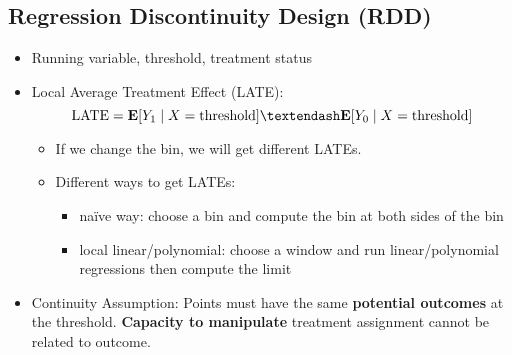 \documentclass[10pt, letterpaper]{article}
\def\E{\vb{E}}
\def\LATE{\mathrm{LATE}}
\begin{document}
\begin{multicols}{2}
\section*{Regression Discontinuity Design (RDD)}
\begin{itemize}
	\item Running variable, threshold, treatment status
	\item Local Average Treatment Effect (LATE): \[\LATE=\E[Y_1\mid X=\text{threshold}] – \E[Y_0\mid X=\text{threshold}]\]
	\begin{itemize}
		\item If we change the bin, we will get different LATEs.
		\item Different ways to get LATEs: 
		\begin{itemize}
			\item naïve way: choose a bin and compute the bin at both sides of the bin
			\item local linear/polynomial: choose a window and run linear/polynomial regressions then compute the limit
		\end{itemize}
	\end{itemize}
	\item Continuity Assumption: Points must have the same \textbf{potential outcomes} at the threshold. \textbf{Capacity to manipulate} treatment assignment cannot be related to outcome.
\end{itemize}


\end{multicols}
\end{document}
